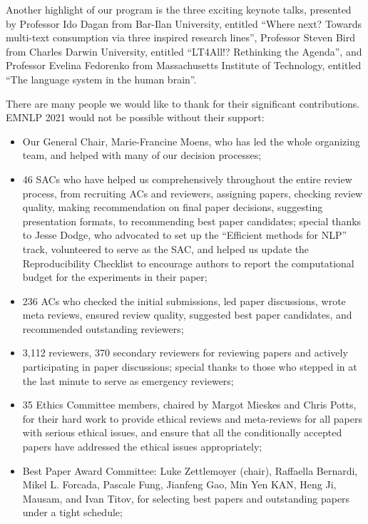 Another highlight of our program is the three exciting keynote talks, presented by Professor Ido Dagan from Bar-Ilan University, entitled ``Where next? Towards multi-text consumption via three inspired research lines'', Professor Steven Bird from Charles Darwin University, entitled ``LT4All!? Rethinking the Agenda'', and Professor Evelina Fedorenko from Massachusetts Institute of Technology, entitled ``The language system in the human brain''.

There are many people we would like to thank for their significant contributions. EMNLP 2021 would not be possible without their support:

\begin{itemize}

\item Our General Chair, Marie-Francine Moens, who has led the whole organizing team, and helped with many of our decision processes;
\item 46 SACs who have helped us comprehensively throughout the entire review process, from recruiting ACs and reviewers, assigning papers, checking review quality, making recommendation on final paper decisions, suggesting presentation formats, to recommending best paper candidates; special thanks to Jesse Dodge, who advocated to set up the ``Efficient methods for NLP'' track, volunteered to serve as the SAC, and helped us update the Reproducibility Checklist to encourage authors to report the computational budget for the experiments in their paper;
\item 236 ACs who checked the initial submissions, led paper discussions, wrote meta reviews, ensured review quality, suggested best paper candidates, and recommended outstanding reviewers;
\item 3,112 reviewers, 370 secondary reviewers for reviewing papers and actively participating in paper discussions; special thanks to those who stepped in at the last minute to serve as emergency reviewers;
\item 35 Ethics Committee members, chaired by Margot Mieskes and Chris Potts, for their hard work to provide ethical reviews and meta-reviews for all papers with serious ethical issues, and ensure that all the conditionally accepted papers have addressed the ethical issues appropriately;
\item Best Paper Award Committee: Luke Zettlemoyer (chair), Raffaella Bernardi, Mikel L. Forcada, Pascale Fung, Jianfeng Gao, Min Yen KAN, Heng Ji, Mausam, and Ivan Titov, for selecting best papers and outstanding papers under a tight schedule;

\end{itemize}
